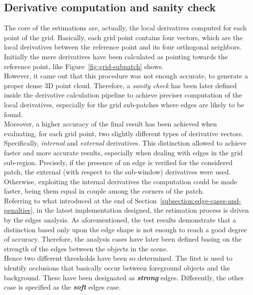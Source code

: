 \subsection{Derivative computation and sanity check}
\label{subsection:derivative-computation}

The core of the estimations are, actually, the local derivatives computed for each point of the grid. 
Basically, each grid point contains four vectors, which are the local derivatives between the reference point and its four orthogonal neighbors. \\
Initially the mere derivatives have been calculated as pointing towards the reference point, like Figure~\ref{fig:grid-subpatch} shows. \\
However, it came out that this procedure was not enough accurate, to generate a proper dense 3D point cloud.
Therefore, a \textit{sanity check} has been later defined inside the derivative calculation pipeline to achieve preciser computation of the local derivatives, especially for the grid sub-patches where edges are likely to be found.\\
Moreover, a higher accuracy of the final result has been achieved when evaluating, for each grid point, two slightly different types of derivative vectors.
Specifically, \textit{internal} and \textit{external} derivatives. 
This distinction allowed to achieve faster and more accurate results, especially when dealing with edges in the grid sub-region. 
Precisely, if the presence of an edge is verified for the considered patch, the external (with respect to the sub-window) derivatives were used.
Otherwise, exploiting the internal derivatives the computation could be made faster, being them equal in couple among the corners of the patch. \\
Referring to what introduced at the end of Section~\ref{subsection:edge-cases-and-penalties}, in the latest implementation designed, the estimation process is driven by the edges analysis. 
As aforementioned, the test results demonstrate that a distinction based only upon the edge shape is not enough to reach a good degree of accuracy.
Therefore, the analysis cases have later been defined basing on the strength of the edges between the objects in the scene.\\
Hence two different thresholds have been so determined. 
The first is used to identify occlusions that basically occur between foreground objects and the background. 
These have been designated as \textbf{\textit{strong}} edges. 
Differently, the other case is specified as the \textbf{\textit{soft}} edges case.
